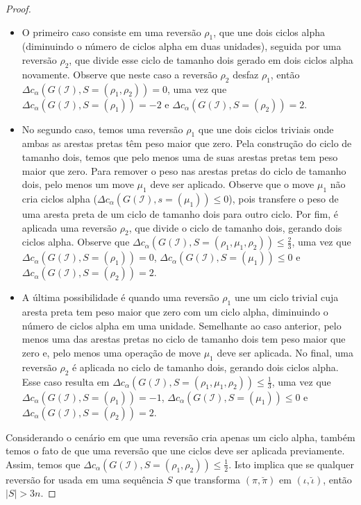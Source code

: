 \begin{proof}
\begin{itemize}
  \item O primeiro caso consiste em uma reversão $\rho_1$, que une dois ciclos alpha (diminuindo o número de ciclos alpha em duas unidades), seguida por uma reversão $\rho_2$, que divide esse ciclo de tamanho dois gerado em dois ciclos alpha novamente. Observe que neste caso a reversão $\rho_2$ desfaz $\rho_1$, então $\Delta c_{\alpha}(G(\mathcal{I}), S=(\rho_1,\rho_2)) = 0 $, uma vez que $\Delta c_{\alpha}(G(\mathcal{I}), S=(\rho_1)) = -2$ e $\Delta c_{\alpha}(G(\mathcal{I}), S=(\rho_2)) = 2$.
  \item No segundo caso, temos uma reversão $\rho_1$ que une dois ciclos triviais onde ambas as arestas pretas têm peso maior que zero. Pela construção do ciclo de tamanho dois, temos que pelo menos uma de suas arestas pretas tem peso maior que zero. Para remover o peso nas arestas pretas do ciclo de tamanho dois, pelo menos um move $\mu_1$ deve ser aplicado. Observe que o move $\mu_1$ não cria ciclos alpha ($\Delta c_{\alpha}(G(\mathcal{I}), s=(\mu_1)) \le 0$), pois transfere o peso de uma aresta preta de um ciclo de tamanho dois para outro ciclo. Por fim, é aplicada uma reversão $\rho_2$, que divide o ciclo de tamanho dois, gerando dois ciclos alpha. Observe que $\Delta c_{\alpha}(G(\mathcal{I}), S=(\rho_1,\mu_1,\rho_2)) \le \frac{2}{3}$, uma vez que $\Delta c_{ \alpha}(G(\mathcal{I}), S=(\rho_1)) = 0$, $\Delta c_{\alpha}(G(\mathcal{I}), S=(\mu_1)) \le 0$ e $\Delta c_{\alpha}(G(\mathcal{I}), S=(\rho_2)) = 2$.
  \item A última possibilidade é quando uma reversão $\rho_1$ une um ciclo trivial cuja aresta preta tem peso maior que zero com um ciclo alpha, diminuindo o número de ciclos alpha em uma unidade. Semelhante ao caso anterior, pelo menos uma das arestas pretas no ciclo de tamanho dois tem peso maior que zero e, pelo menos uma operação de move $\mu_1$ deve ser aplicada. No final, uma reversão $\rho_2$ é aplicada no ciclo de tamanho dois, gerando dois ciclos alpha. Esse caso resulta em $\Delta c_{\alpha}(G(\mathcal{I}), S=(\rho_1,\mu_1,\rho_2)) \le \frac{1}{3}$, uma vez que $\Delta c_{\alpha}(G(\mathcal{I}), S=(\rho_1)) = -1$, $\Delta c_{\alpha}(G(\mathcal{I}), S=(\mu_1)) \le 0$ e $\Delta c_{\alpha}(G(\mathcal{I}), S=(\rho_2)) = 2$.
\end{itemize}

Considerando o cenário em que uma reversão cria apenas um ciclo alpha, também temos o fato de que uma reversão que une ciclos deve ser aplicada previamente. Assim, temos que $\Delta c_{\alpha}(G(\mathcal{I}), S=(\rho_1,\rho_2)) \le \frac{1}{2}$. Isto implica que se qualquer reversão for usada em uma sequência $S$ que transforma $(\pi,\breve\pi)$ em $(\iota,\breve\iota)$, então $|S| > 3n$.


\end{proof}
